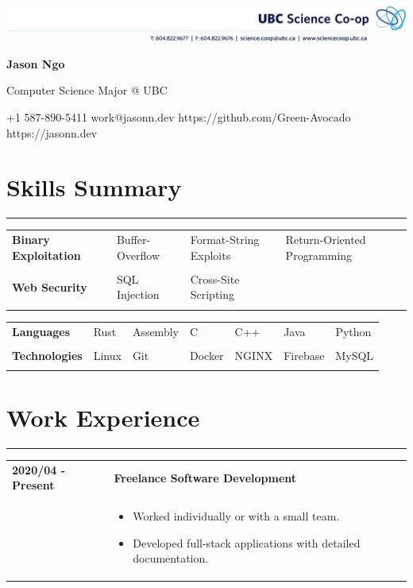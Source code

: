 \documentclass[letterpaper]{article}
\newcommand{\sect}[1]{\section*{#1}
                        {\color{cyan}
                        \rule{\textwidth}{1pt}
                        \vspace{-1ex}}}
\begin{document}
    \includegraphics[width=\textwidth]{ScienceCo-opHeader_2020.png}

    {\Huge
    \textbf{Jason Ngo}}

    \vspace{1ex}
    {\large
    Computer Science Major @ UBC}

    {\small
    +1 587-890-5411
    \hspace*{\fill}
    work@jasonn.dev
    \hspace*{\fill}
    https://github.com/Green-Avocado
    \hspace*{\fill}
    https://jasonn.dev
    }

    \sect{Skills Summary}

        \begin{tabular}{p{}
                        p{}
                        p{}
                        p{}}
            \textbf{Binary Exploitation} &
                Buffer-Overflow & Format-String Exploits & Return-Oriented Programming \\
                \\
            \textbf{Web Security} &
                SQL Injection & Cross-Site Scripting \\
                \\
        \end{tabular}

        \begin{tabular}{p{}
                        p{}
                        p{}
                        p{}
                        p{}
                        p{}
                        p{}}
            \textbf{Languages} &
                Rust & Assembly & C & C++ & Java & Python \\
                \\
            \textbf{Technologies} &
                Linux & Git & Docker & NGINX & Firebase & MySQL \\
                \\
        \end{tabular}

    \sect{Work Experience}

        \begin{tabular}{p{} p{}} 
            \textbf{2020/04 - Present} & \textbf{Freelance Software Development} \\
            & \begin{itemize}
                \item Worked individually or with a small team.
                \item Developed full-stack applications with detailed documentation.
            \end{itemize}
        \end{tabular}
\end{document}
